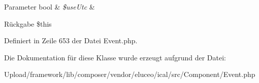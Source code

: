 \begin{DoxyParams}[1]{Parameter}
bool & {\em \$use\+Utc} & \\
\hline
\end{DoxyParams}
\begin{DoxyReturn}{Rückgabe}
\$this 
\end{DoxyReturn}


Definiert in Zeile 653 der Datei Event.\+php.



Die Dokumentation für diese Klasse wurde erzeugt aufgrund der Datei\+:\begin{DoxyCompactItemize}
\item 
Upload/framework/lib/composer/vendor/eluceo/ical/src/\+Component/Event.\+php\end{DoxyCompactItemize}
